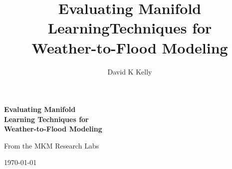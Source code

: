 \documentclass{article}
\title{Evaluating Manifold \\LearningTechniques for \\ Weather-to-Flood Modeling}
\author{David K Kelly}
\date{}
\begin{document}
\begin{titlepage}
\begin{center}

\vspace*{2cm}

\begin{figure}\centering
{}
\end{figure}

\vspace{2cm}

{\Huge\bfseries Evaluating Manifold \\Learning Techniques for \\ Weather-to-Flood Modeling\par}

\vspace{2cm}

{\Large From the MKM Research Labs\par}

\vspace{1cm}

{\large \today\par}

\end{center}
\end{titlepage}
\clearpage


\tableofcontents

\clearpage
\end{document}
